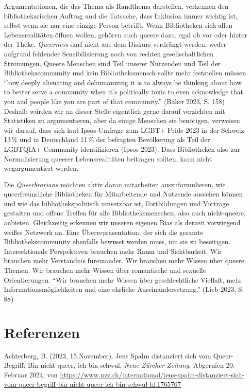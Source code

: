 \documentclass[a4paper,
fontsize=11pt,
oneside,
numbers=noperiodatend,
parskip=half-,
bibliography=totoc,
final
]{scrartcl}
\begin{document}
Argumentationen, die das Thema als Randthema darstellen, verkennen den
bibliothekarischen Auftrag und die Tatsache, dass Inklusion immer
wichtig ist, selbst wenn sie nur eine einzige Person betrifft. Wenn
Bibliotheken sich allen Lebensrealitäten öffnen wollen, gehören auch
queere dazu, egal ob vor oder hinter der Theke. \emph{Queerness} darf
nicht aus dem Diskurs verdrängt werden, weder aufgrund fehlender
Sensibilisierung noch von rechten gesellschaftlichen Strömungen. Queere
Menschen sind Teil unserer Nutzenden und Teil der Bibliothekscommunity
und kein Bibliotheksmensch sollte mehr feststellen müssen \enquote{how
deeply alienating and dehumanizing it is to always be thinking about how
to better serve a community when it's politically toxic
to even acknowledge that you and people like you are part of that
community.} (Baker 2023, S. 158) Deshalb würden wir an dieser Stelle
eigentlich gerne darauf verzichten mit Statistiken zu argumentieren,
aber da einige Menschen sie benötigen, verweisen wir darauf, dass sich
laut Ipsos-Umfrage zum LGBT+ Pride 2023 in der Schweiz 13\,\% und in
Deutschland 11\,\% der befragten Bevölkerung als Teil der LGBTQIA+
Community identifizieren (Ipsos 2023). Dass Bibliotheken also zur
Normalisierung queerer Lebensrealitäten beitragen sollten, kann nicht
wegargumentiert werden.

Die \emph{Queerbrarians} möchten aktiv daran mitarbeiten
auszuformulieren, wie queerfreundliche Bibliotheken für Mitarbeitende
und Nutzende aussehen können und wie das bibliothekspolitisch umsetzbar
ist, Fortbildungen und Vorträge gestalten und offene Treffen für alle
Bibliotheksmenschen, also auch nicht-queere, anbieten. Gleichzeitig
erkennen wir unseren eigenen Bias als derzeit vorwiegend weißes Netzwerk
an. Eine Überrepräsentation, der sich die gesamte Bibliothekscommunity
ebenfalls bewusst werden muss, um sie zu beseitigen. Intersektionale
Perspektiven brauchen mehr Raum und Sichtbarkeit. Wir brauchen mehr
Verständnis füreinander. Wir brauchen mehr Wissen über queere Themen.
Wir brauchen mehr Wissen über romantische und sexuelle Orientierungen.
\enquote{Wir brauchen mehr Wissen über geschlechtliche Vielfalt, mehr
Informationsmöglichkeiten und eine ehrliche Auseinandersetzung.} (Lieb
2023, S. 88)

\section{Referenzen}\label{referenzen}

Achterberg, B. (2023, 15.November). Jens Spahn distanziert sich vom
Queer-Begriff: Bin nicht queer, ich bin schwul. \emph{Neue Zürcher
Zeitung}. Abgerufen 20. Februar 2024, von
\url{https://www.nzz.ch/international/jens-spahn-distanziert-sich-vom-queer-begriff-bin-nicht-queer-ich-bin-schwul-ld.1765767}
\end{document}
